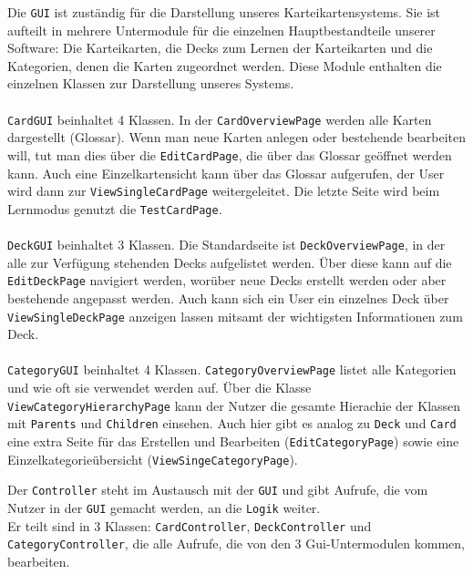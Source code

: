 \documentclass[fontsize=12pt,paper=A4,twoside]{scrartcl}
\begin{document}
    Die \texttt{GUI} ist zuständig für die Darstellung unseres Karteikartensystems.
    Sie ist aufteilt in mehrere Untermodule für die einzelnen Hauptbestandteile
    unserer Software: Die Karteikarten, die Decks zum Lernen der Karteikarten und die Kategorien,
    denen die Karten zugeordnet werden. Diese Module enthalten die einzelnen Klassen zur Darstellung
    unseres Systems.\\\\
     \texttt{CardGUI} beinhaltet 4 Klassen. In der \texttt{CardOverviewPage} werden
    alle Karten dargestellt (Glossar). Wenn man neue Karten anlegen oder bestehende bearbeiten will, tut
    man dies über die \texttt{EditCardPage}, die über das Glossar geöffnet werden kann. Auch eine Einzelkartensicht
    kann über das Glossar aufgerufen, der User wird dann zur \texttt{ViewSingleCardPage} weitergeleitet.
    Die letzte Seite wird beim Lernmodus genutzt die \texttt{TestCardPage}.\\\\
     \texttt{DeckGUI} beinhaltet 3 Klassen. Die Standardseite ist \texttt{DeckOverviewPage},
    in der alle zur Verfügung stehenden Decks aufgelistet werden. Über diese kann auf die \texttt{EditDeckPage}
    navigiert werden, worüber neue Decks erstellt werden oder aber bestehende angepasst werden. Auch kann sich ein
    User ein einzelnes Deck über \texttt{ViewSingleDeckPage} anzeigen lassen mitsamt der wichtigsten Informationen
    zum Deck.\\\\
     \texttt{CategoryGUI} beinhaltet 4 Klassen. \texttt{CategoryOverviewPage} listet alle Kategorien
    und wie oft sie verwendet werden auf. Über die Klasse \texttt{ViewCategoryHierarchyPage} kann
    der Nutzer die gesamte Hierachie der Klassen mit \texttt{Parents} und \texttt{Children} einsehen.
    Auch hier gibt es analog zu \texttt{Deck} und \texttt{Card} eine extra Seite für das Erstellen und Bearbeiten
    (\texttt{EditCategoryPage}) sowie eine Einzelkategorieübersicht (\texttt{ViewSingeCategoryPage}).

    \newpage
    Der \texttt{Controller} steht im Austausch mit der \texttt{GUI} und gibt Aufrufe, die vom Nutzer
    in der \texttt{GUI} gemacht werden, an die \texttt{Logik} weiter.\\
    Er teilt sind in 3 Klassen: \texttt{CardController}, \texttt{DeckController} und \texttt{CategoryController}, die alle Aufrufe, die von den 3 Gui-Untermodulen kommen, bearbeiten.
\end{document}
